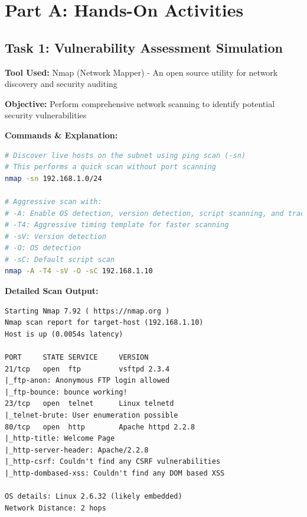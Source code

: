 \documentclass[12pt]{article}
\begin{document}


\section*{Part A: Hands-On Activities}

\subsection*{Task 1: Vulnerability Assessment Simulation}
\textbf{Tool Used:} Nmap (Network Mapper) - An open source utility for network discovery and security auditing

\textbf{Objective:} Perform comprehensive network scanning to identify potential security vulnerabilities

\textbf{Commands \& Explanation:}
\begin{lstlisting}[language=bash]
# Discover live hosts on the subnet using ping scan (-sn)
# This performs a quick scan without port scanning
nmap -sn 192.168.1.0/24

# Aggressive scan with:
# -A: Enable OS detection, version detection, script scanning, and traceroute
# -T4: Aggressive timing template for faster scanning
# -sV: Version detection
# -O: OS detection 
# -sC: Default script scan
nmap -A -T4 -sV -O -sC 192.168.1.10
\end{lstlisting}

\textbf{Detailed Scan Output:}
\begin{lstlisting}
Starting Nmap 7.92 ( https://nmap.org )
Nmap scan report for target-host (192.168.1.10)
Host is up (0.0054s latency)

PORT     STATE SERVICE     VERSION
21/tcp   open  ftp         vsftpd 2.3.4
|_ftp-anon: Anonymous FTP login allowed
|_ftp-bounce: bounce working!
23/tcp   open  telnet      Linux telnetd
|_telnet-brute: User enumeration possible
80/tcp   open  http        Apache httpd 2.2.8
|_http-title: Welcome Page
|_http-server-header: Apache/2.2.8
|_http-csrf: Couldn't find any CSRF vulnerabilities
|_http-dombased-xss: Couldn't find any DOM based XSS

OS details: Linux 2.6.32 (likely embedded)
Network Distance: 2 hops
\end{lstlisting}
\end{document}
